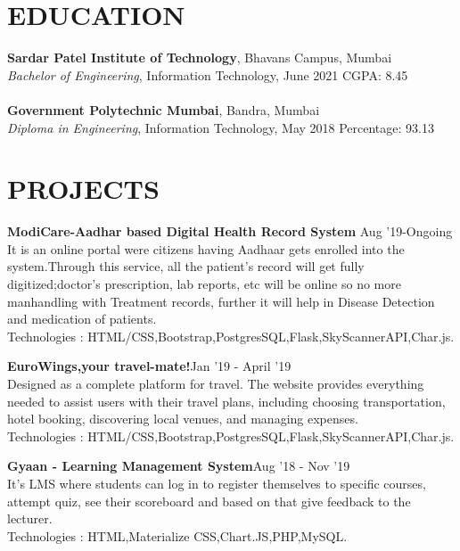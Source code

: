 \documentclass[margin]{res}
\begin{document}
\begin{resume}

\section{EDUCATION}
\textbf{Sardar Patel Institute of  Technology}, Bhavans Campus, Mumbai\\
{\sl Bachelor of Engineering}, Information Technology, June 2021\hfill 
CGPA: 8.45
\\
\\
\textbf{Government Polytechnic Mumbai}, Bandra, Mumbai\\
{\sl Diploma in Engineering}, Information Technology, May 2018\hfill 
Percentage: 93.13%


\section{PROJECTS}
\par
\textbf{ModiCare-Aadhar based Digital Health Record  System}\hfill
Aug '19-Ongoing
\\
It is an online portal were citizens having Aadhaar gets enrolled into the system.Through this service, all the patient's record will get fully digitized;doctor's prescription, lab reports, etc will be online so no more manhandling with Treatment records, further it will help in Disease Detection and medication of patients.\\
Technologies : HTML/CSS,Bootstrap,PostgresSQL,Flask,SkyScannerAPI,Char.js.
\par
\textbf{EuroWings,your travel-mate!}\hfill Jan '19 - April '19\\
Designed as a complete platform for travel. The website provides everything needed to assist users with their travel plans, including choosing transportation, hotel booking, discovering local venues, and managing expenses. \\
Technologies : HTML/CSS,Bootstrap,PostgresSQL,Flask,SkyScannerAPI,Char.js.
\par
\textbf{Gyaan - Learning Management System}\hfill Aug '18 - Nov '19\\
It's LMS where students can log in to register themselves to specific courses, attempt quiz, see their scoreboard and based on that give feedback to the lecturer. \\
Technologies : HTML,Materialize CSS,Chart.JS,PHP,MySQL.


\end{resume}
\end{document}
